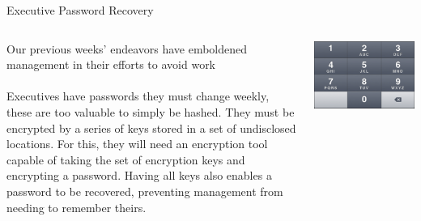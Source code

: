 \documentclass[xcolor=dvipsnames]{beamer}
\begin{document}
	\begin{frame}{Executive Password Recovery}
		\begin{columns}
			\begin{column}{0.5\textwidth}
				  Our previous weeks' endeavors have emboldened management in their efforts to avoid
          work
					\\~\\
          Executives have passwords they must change weekly, these are too valuable to simply
          be hashed. They must be encrypted by a series of keys stored in a set of 
          undisclosed locations. For this, they will need an encryption tool capable
          of taking the set of encryption keys and encrypting a password. Having all keys
          also enables a password to be recovered, preventing management from needing to
          remember theirs.
			\end{column}
			\begin{column}{0.5\textwidth}
				\includegraphics[width=\textwidth]{images/keypad}
			\end{column}
		\end{columns}
	\end{frame}
	
\end{document}
